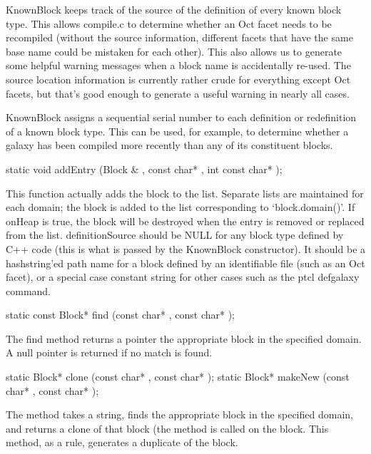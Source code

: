 KnownBlock keeps track of the source of the definition of every
known block type.  This allows compile.c to determine whether an Oct
facet needs to be recompiled (without the source information, different
facets that have the same base name could be mistaken for each other).
This also allows us to generate some helpful warning messages when
a block name is accidentally re-used.  The source location information
is currently rather crude for everything except Oct facets, but that's
good enough to generate a useful warning in nearly all cases.

KnownBlock assigns a sequential serial number to each definition or
redefinition of a known block type.  This can be used, for example,
to determine whether a galaxy has been compiled more recently than
any of its constituent blocks.

\begin{example}
static void addEntry (Block & , const char* , 
	int  const char* );
\end{example}

This function actually adds the block to the list.  Separate lists are
maintained for each domain; the block is added to the list corresponding to
`block.domain()'.  If onHeap is true, the block will be destroyed when the
entry is removed or replaced from the list.
definitionSource should be NULL for any block type defined
by C++ code (this is what is passed by the KnownBlock constructor).
It should be a hashstring'ed path name for a block defined by an
identifiable file (such as an Oct facet), or a special case constant
string for other cases such as the ptcl defgalaxy command.

\begin{example}
static const Block* find (const char* , const char* );
\end{example}

The find method returns a pointer the appropriate block in
the specified domain.  A null pointer is returned if no match
is found.

\begin{example}
static Block* clone (const char* , const char* );
static Block* makeNew (const char* , const char* );
\end{example}

The  method takes a string, finds the appropriate block in
the specified domain, and returns a clone of that block (the
 method is called on the block.  This method, as
a rule, generates a duplicate of the block.

